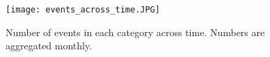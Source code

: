 
\begin{figure}[]
    \centering
    \texttt{[image: events\_across\_time.JPG]}
    \caption{Number of events in each category across time. Numbers are aggregated monthly.}
    \label{fig:events}
\end{figure}


